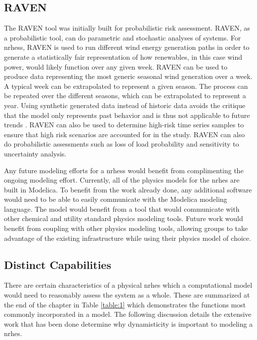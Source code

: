 \subsection{RAVEN}


The RAVEN tool was initially built for probabilistic risk assessment. RAVEN, as a probabilistic tool, can do parametric and stochastic analyses of systems\cite{RabitiRAVEN}. For \ac{nrhess}, RAVEN is used to run different wind energy generation paths in order to generate a statistically fair representation of how renewables, in this case wind power, would likely function over any given week. RAVEN can be used to produce data representing the most generic seasonal wind generation over a week. A typical week can be extrapolated to represent a given season. The process can be repeated over the different seasons, which can be extrapolated to represent a year. Using synthetic generated data instead of historic data avoids the critique that the model only represents past behavior and is thus not applicable to future trends \cite{redfoot_epiney_2016}. RAVEN can also be used to determine high-risk time series samples to ensure that high risk scenarios are accounted for in the study. RAVEN can also do probabilistic assessments such as loss of load probability and sensitivity to uncertainty analysis.

Any future modeling efforts for a \ac{nrhess} would benefit from complimenting the ongoing modeling effort. Currently, all of the physics models for the \ac{nrhes} are built in Modelica. To benefit from the work already done, any additional software would need to be able to easily communicate with the Modelica modeling language.  The model would benefit from a tool that would communicate with other chemical and utility standard physics modeling tools. Future work would benefit from coupling with other physics modeling tools, allowing groups to take advantage of the existing infrastructure while using their physics model of choice.

\subsection{Distinct Capabilities}
There are certain characteristics of a physical \ac{nrhes} which a computational model would need to reasonably assess the system as a whole. These are summarized at the end of the chapter in Table \ref{table:1} which demonstrates the functions most commonly incorporated in a model. The following discussion details the extensive work that has been done determine why dynamisticity is important to modeling a \ac{nrhes}.

